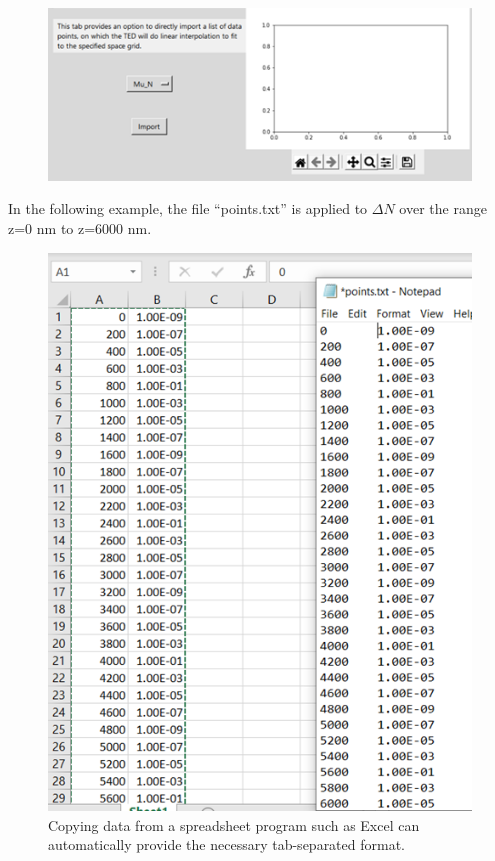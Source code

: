 \documentclass[11pt,letterpaper,titlepage]{article}
\begin{document}
		\begin{figure}[H]
			\label{fig:listupload_blank}
			\centering
			\includegraphics[scale=1]{"listupload_blank"}
		\end{figure}
	
		\par In the following example, the file “points.txt” is applied to $\Delta N$ over the range z=0 nm to z=6000 nm.
		
		\begin{figure}[H]
			\label{fig:listupload_example}
			\centering
			\includegraphics[scale=1]{"listupload_example"}
			\caption{Copying data from a spreadsheet program such as Excel can automatically provide the necessary tab-separated format.}
		\end{figure}
		
\end{document}

